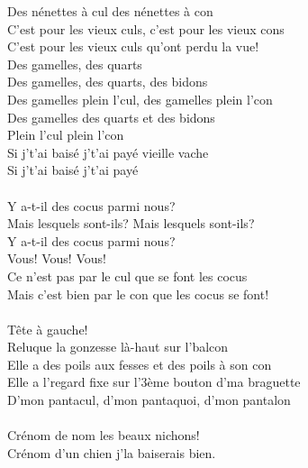 \breakpage
Des nénettes à cul des nénettes à con
\\C'est pour les vieux culs, c'est pour les vieux cons
\\C'est pour les vieux culs qu'ont perdu la vue!
\\Des gamelles, des quarts
\\Des gamelles, des quarts, des bidons
\\Des gamelles plein l'cul, des gamelles plein l'con
\\Des gamelles des quarts et des bidons
\\Plein l'cul plein l'con
\\Si j't'ai baisé j't'ai payé vieille vache
\\Si j't'ai baisé j't'ai payé
\\\\Y a-t-il des cocus parmi nous?
\\Mais lesquels sont-ils? Mais lesquels sont-ils?
\\Y a-t-il des cocus parmi nous?
\\Vous! Vous! Vous!
\\Ce n'est pas par le cul que se font les cocus
\\Mais c'est bien par le con que les cocus se font!
\\\\Tête à gauche!
\\Reluque la gonzesse là-haut sur l'balcon
\\Elle a des poils aux fesses et des poils à son con
\\Elle a l'regard fixe sur l'3ème bouton d'ma braguette
\\D'mon pantacul, d'mon pantaquoi, d'mon pantalon
\\\\Crénom de nom les beaux nichons!
\\Crénom d'un chien j'la baiserais bien.

\breakpage